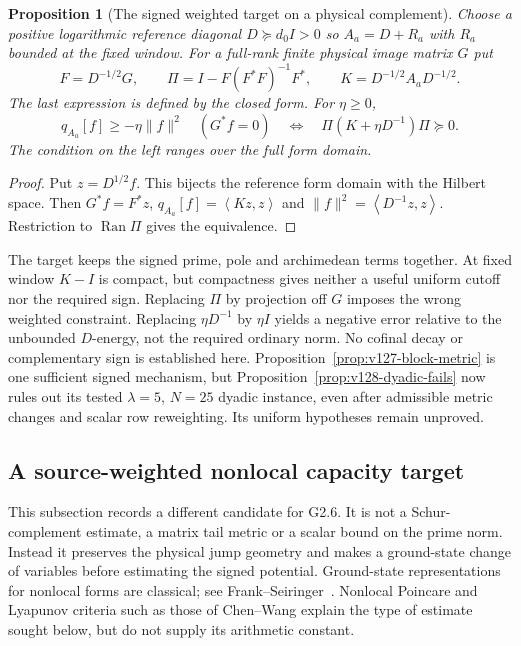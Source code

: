 \documentclass[11pt]{article}
\newtheorem{proposition}[theorem]{Proposition}
\theoremstyle{remark}
\newcommand{\ip}[2]{\left\langle #1,#2\right\rangle}
\begin{document}
\begin{proposition}[The signed weighted target on a physical complement]
\label{prop:v127-weighted-complement}
Choose a positive logarithmic reference diagonal $D\succeq d_0I>0$
so $A_a=D+R_a$ with $R_a$ bounded at the fixed window. For a full-rank
finite physical image matrix $G$ put
\[
 F=D^{-1/2}G,\qquad
 \Pi=I-F(F^*F)^{-1}F^*,\qquad
 K=D^{-1/2}A_aD^{-1/2}.
\]
The last expression is defined by the closed form. For $\eta\ge0$,
\begin{equation}\label{eq:v127-weighted-complement}
 q_{A_a}[f]\ge-\eta\|f\|^2\quad(G^*f=0)
 \quad\Longleftrightarrow\quad
 \Pi(K+\eta D^{-1})\Pi\succeq0.
\end{equation}
The condition on the left ranges over the full form domain.
\end{proposition}
\begin{proof}
Put $z=D^{1/2}f$. This bijects the reference form domain with the
Hilbert space. Then $G^*f=F^*z$,
$q_{A_a}[f]=\ip{Kz}{z}$ and $\|f\|^2=\ip{D^{-1}z}{z}$.
Restriction to $\operatorname{Ran}\Pi$ gives the equivalence.
\end{proof}

The target keeps the signed prime, pole and archimedean terms together.
At fixed window $K-I$ is compact, but compactness gives neither a useful
uniform cutoff nor the required sign. Replacing $\Pi$ by projection off
$G$ imposes the wrong weighted constraint. Replacing $\eta D^{-1}$ by
$\eta I$ yields a negative error relative to the unbounded $D$-energy,
not the required ordinary norm. No cofinal decay or complementary sign
is established here. Proposition~\ref{prop:v127-block-metric} is one
sufficient signed mechanism, but Proposition~\ref{prop:v128-dyadic-fails}
now rules out its tested $\lambda=5$, $N=25$ dyadic instance, even
after admissible metric changes and scalar row reweighting. Its
uniform hypotheses remain unproved.

\subsection*{A source-weighted nonlocal capacity target}

This subsection records a different candidate for G2.6. It is not a
Schur-complement estimate, a matrix tail metric or a scalar bound on the
prime norm. Instead it preserves the physical jump geometry and makes
a ground-state change of variables before estimating the signed
potential. Ground-state representations for nonlocal forms are
classical; see Frank--Seiringer~\cite{FrankSeiringer2008}. Nonlocal
Poincare and Lyapunov criteria such as those of Chen--Wang
\cite{ChenWang2013} explain the type of estimate sought below, but do
not supply its arithmetic constant.
\end{document}
